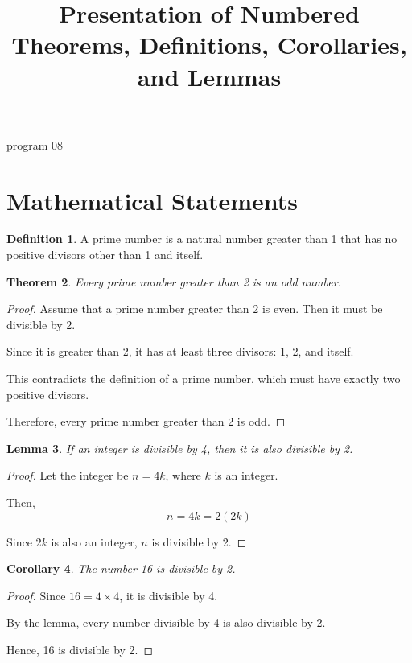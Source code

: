 program 08 \documentclass[12pt]{article}
\newtheorem{theorem}{Theorem}[section]
\newtheorem{lemma}[theorem]{Lemma}
\newtheorem{corollary}[theorem]{Corollary}
\theoremstyle{definition}
\newtheorem{definition}[theorem]{Definition}
\begin{document}
\title{Presentation of Numbered Theorems, Definitions, Corollaries, and Lemmas}
\author{}
\date{}
\maketitle

\section{Mathematical Statements}

\begin{definition}
A prime number is a natural number greater than 1 that has no positive divisors other than 1 and itself.
\end{definition}

\begin{theorem}
Every prime number greater than 2 is an odd number.
\end{theorem}

\begin{proof}
Assume that a prime number greater than 2 is even. Then it must be divisible by 2.

Since it is greater than 2, it has at least three divisors: 1, 2, and itself.

This contradicts the definition of a prime number, which must have exactly two positive divisors.

Therefore, every prime number greater than 2 is odd.
\end{proof}

\begin{lemma}
If an integer is divisible by 4, then it is also divisible by 2.
\end{lemma}

\begin{proof}
Let the integer be \( n = 4k \), where \( k \) is an integer.

Then,
\[
n = 4k = 2(2k)
\]

Since \( 2k \) is also an integer, \( n \) is divisible by 2.
\end{proof}

\begin{corollary}
The number 16 is divisible by 2.
\end{corollary}

\begin{proof}
Since \(16 = 4 \times 4\), it is divisible by 4.

By the lemma, every number divisible by 4 is also divisible by 2.

Hence, 16 is divisible by 2.
\end{proof}
\end{document}
